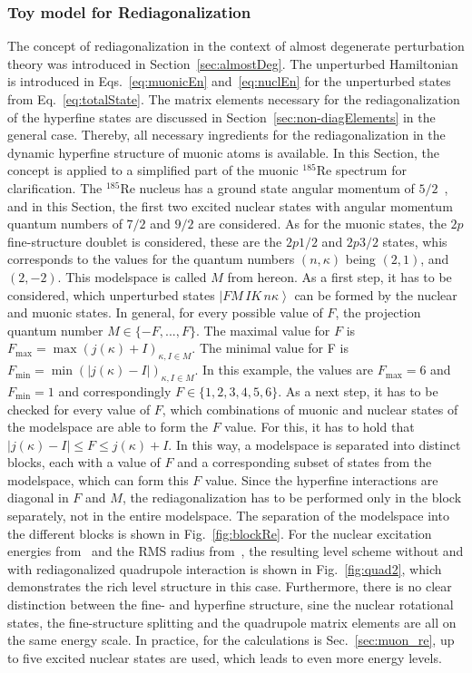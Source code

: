 \subsubsection{Toy model for Rediagonalization}
\label{sec:toyModelRediag}
The concept of rediagonalization in the context of almost degenerate perturbation theory was introduced in Section~\ref{sec:almostDeg}. The unperturbed Hamiltonian is introduced in Eqs.~\eqref{eq:muonicEn} and~\eqref{eq:nuclEn} for the unperturbed states from Eq.~\eqref{eq:totalState}. The matrix elements necessary for the rediagonalization of the hyperfine states are discussed in Section~\ref{sec:non-diagElements} in the general case. Thereby, all necessary ingredients for the rediagonalization in the dynamic hyperfine structure of muonic atoms is available. In this Section, the concept is applied to a simplified part of the muonic $^{185}$Re spectrum for clarification. The $^{185}$Re nucleus has a ground state angular momentum of $5/2$~\cite{Stone2005}, and in this Section, the first two excited nuclear states with angular momentum quantum numbers of $7/2$ and $9/2$ are considered. As for the muonic states, the $2p$ fine-structure doublet is considered, these are the $2p1/2$ and $2p3/2$ states, whis corresponds to the values for the quantum numbers $(n,\kappa)$ being $(2,1)$, and $(2,-2)$. This modelspace is called $M$ from hereon.
As a first step, it has to be considered, which unperturbed states $\left|FM\,IK\,n\kappa\right>$ can be formed by the nuclear and muonic states. In general, for every possible value of $F$, the projection quantum number $M\in \{-F,...,F\}$. The maximal value for $F$ is $F_{\text{max}}=\max(j(\kappa)+I)_{\kappa, I \in M}$. The minimal value for F is $F_{\text{min}}=\min(|j(\kappa)-I|)_{\kappa, I \in M}$. In this example, the values are $F_{\text{max}}=6$ and $F_{\text{min}}=1$ and correspondingly $F\in\{1,2,3,4,5,6\}$. As a next step, it has to be checked for every value of $F$, which combinations of muonic and nuclear states of the modelspace are able to form the $F$ value. For this, it has to hold that $|j(\kappa)-I|\leq F \leq j(\kappa)+I$. In this way, a modelspace is separated into distinct blocks, each with a value of $F$ and a corresponding subset of states from the modelspace, which can form this $F$ value. Since the hyperfine interactions are diagonal in $F$ and $M$, the rediagonalization has to be performed only in the block separately, not in the entire modelspace. The separation of the modelspace into the different blocks is shown in Fig.~\ref{fig:blockRe}. For the nuclear excitation energies from~\cite{ENSDF} and the RMS radius from~\cite{Angeli2013}, the resulting level scheme without and with rediagonalized quadrupole interaction is shown in Fig.~\ref{fig:quad2}, which demonstrates the rich level structure in this case. Furthermore, there is no clear distinction between the fine- and hyperfine structure, sine the nuclear rotational states, the fine-structure splitting and the quadrupole matrix elements are all on the same energy scale. In practice, for the calculations is Sec.~\ref{sec:muon_re}, up to five excited nuclear states are used, which leads to even more energy levels.

